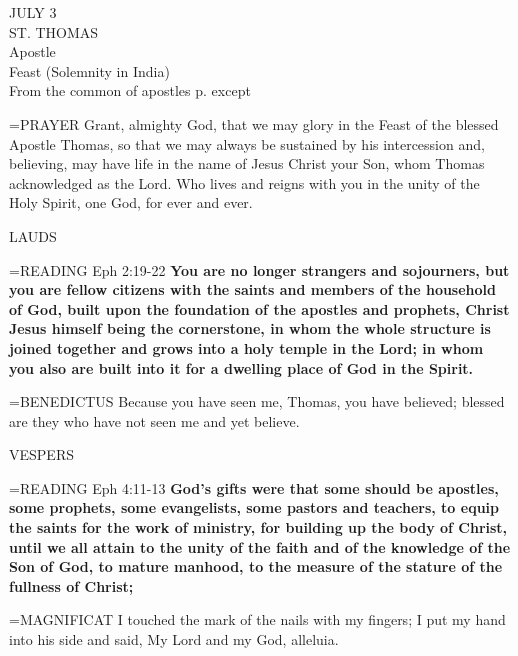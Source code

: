 \begin{center}\normalsize JULY 3\\
\footnotesize ST. THOMAS\\
\footnotesize Apostle\\
\footnotesize Feast (Solemnity in India)\\
\footnotesize From the common of apostles p.     except\\
\end{center}

\hangindent=\parindent \small{PRAYER 
Grant, almighty God,
that we may glory in the Feast of the blessed Apostle Thomas,
so that we may always be sustained by his intercession
and, believing, may have life
in the name of Jesus Christ your Son,
whom Thomas acknowledged as the Lord.
Who lives and reigns with you in the unity of the Holy Spirit,
one God, for ever and ever.\\}
 
\begin{flushleft}\normalsize LAUDS\\\end{flushleft}

\hangindent=\parindent \small{READING} Eph 2:19-22 \textbf{You are no longer strangers and sojourners,
but you are fellow citizens with the saints and members of the
household of God, built upon the foundation of the apostles and
prophets, Christ Jesus himself being the cornerstone, in whom the
whole structure is joined together and grows into a holy temple in
the Lord; in whom you also are built into it for a dwelling place of
God in the Spirit.\\}
 
\hangindent=\parindent \small{BENEDICTUS  Because you have seen me, Thomas, you have believed;
blessed are they who have not seen me and yet believe.\\}
 
\begin{flushleft}\normalsize VESPERS\\\end{flushleft}

\hangindent=\parindent \small{READING} Eph 4:11-13 \textbf{God’s gifts were that some should be apostles,
some prophets, some evangelists, some pastors and teachers, to
equip the saints for the work of ministry, for building up the body
of Christ, until we all attain to the unity of the faith and of the
knowledge of the Son of God, to mature manhood, to the measure
of the stature of the fullness of Christ;\\}
 
\hangindent=\parindent \small{MAGNIFICAT  I touched the mark of the nails with my fingers; I put my
hand into his side and said, My Lord and my God, alleluia.\\}
 
